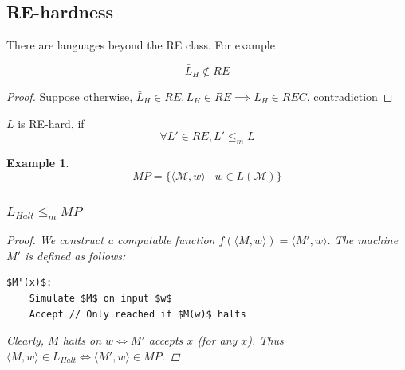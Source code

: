 \documentclass{article}
\newtheorem{theorem}{Theorem}[section]
\newtheorem{example}[theorem]{Example}
\newtheorem{definition}[theorem]{Definition}
\let\olddefinition\definition
\let\endolddefinition\enddefinition
\renewenvironment{definition}
  {\begin{tcolorbox}[
      colback=red!10,
      colframe=red!50!black,
      boxrule=0.6pt,
      arc=2pt,
      left=6pt,right=6pt,top=4pt,bottom=4pt,
      breakable
    ]\olddefinition}
  {\endolddefinition\end{tcolorbox}}
\let\oldtheorem\theorem
\let\endoldtheorem\endtheorem
\renewenvironment{theorem}
  {\begin{tcolorbox}[
      colback=yellow!6,
      colframe=yellow!60!black,
      boxrule=0.6pt,
      arc=2pt,
      left=6pt,right=6pt,top=4pt,bottom=4pt,
      parbox=false
    ]\oldtheorem}
  {\endoldtheorem\end{tcolorbox}}
\begin{document}
\subsection{RE-hardness}
There are languages beyond the RE class. For example 
\begin{theorem}
    \[\bar{L}_H \notin RE\]
\end{theorem}
\begin{proof}
    Suppose otherwise, $\bar{L}_H \in RE, L_H \in RE \implies L_H \in REC$, contradiction
\end{proof}
\begin{definition}[RE-hard]
    $L$ is RE-hard, if 
    \[\forall L' \in RE, L' \leq_m L\]
\end{definition}
\begin{example}
    \[MP = \{\langle \mathcal{M}, w\rangle \mid w \in L(\mathcal{M})\}\]
    \subsubsection*{$L_{Halt} \leq_m MP$}
    \begin{proof}
        We construct a computable function $f(\langle M, w \rangle) = \langle M', w \rangle$. 
        The machine $M'$ is defined as follows:
        \begin{lstlisting}[mathescape=true]
$M'(x)$:
    Simulate $M$ on input $w$
    Accept // Only reached if $M(w)$ halts
        \end{lstlisting}
        Clearly, $M$ halts on $w \iff M'$ accepts $x$ (for any $x$). 
        Thus $\langle M, w \rangle \in L_{Halt} \iff \langle M', w \rangle \in MP$.
    \end{proof}
\end{example}
\end{document}

